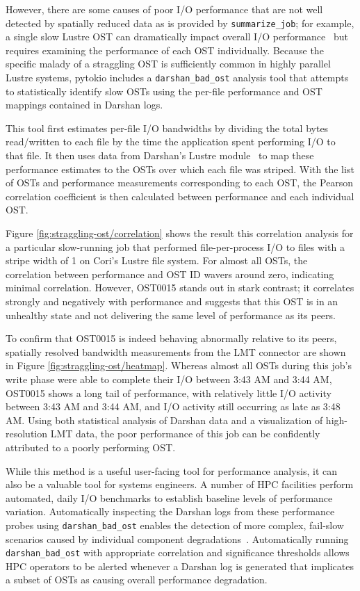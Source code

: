 However, there are some causes of poor I/O performance that are not well detected by spatially reduced data as is provided by \texttt{summarize\_job}; 
for example, a single slow Lustre OST can dramatically impact overall I/O performance~\cite{Byna2013} but requires examining the performance of each OST individually.
Because the specific malady of a straggling OST is sufficiently common in highly parallel Lustre systems, pytokio includes a \texttt{darshan\_bad\_ost} analysis tool that attempts to statistically identify slow OSTs using the per-file performance and OST mappings contained in Darshan logs.

This tool first estimates per-file I/O bandwidths by dividing the total bytes read/written to each file by the time the application spent performing I/O to that file.
It then uses data from Darshan's Lustre module~\cite{Snyder2016modular} to map these performance estimates to the OSTs over which each file was striped.
With the list of OSTs and performance measurements corresponding to each OST, the Pearson correlation coefficient is then calculated between performance and each individual OST.

Figure \ref{fig:straggling-ost/correlation} shows the result this correlation analysis for a particular slow-running job that performed file-per-process I/O to files with a stripe width of 1 on Cori's Lustre file system.
For almost all OSTs, the correlation between performance and OST ID wavers around zero, indicating minimal correlation.
However, OST0015 stands out in stark contrast; it correlates strongly and negatively with performance and suggests that this OST is in an unhealthy state and not delivering the same level of performance as its peers.

To confirm that OST0015 is indeed behaving abnormally relative to its peers, spatially resolved bandwidth measurements from the LMT connector are shown in Figure \ref{fig:straggling-ost/heatmap}.
Whereas almost all OSTs during this job's write phase were able to complete their I/O between 3:43 AM and 3:44 AM, OST0015 shows a long tail of performance, with relatively little I/O activity between 3:43 AM and 3:44 AM, and I/O activity still occurring as late as 3:48 AM.
Using both statistical analysis of Darshan data and a visualization of high-resolution LMT data, the poor performance of this job can be confidently attributed to a poorly performing OST.

While this method is a useful user-facing tool for performance analysis, it can also be a valuable tool for systems engineers.
A number of HPC facilities perform automated, daily I/O benchmarks to establish baseline levels of performance variation\cite{Lockwood2017,Simakov2015}.
Automatically inspecting the Darshan logs from these performance probes using  \texttt{darshan\_bad\_ost} enables the detection of more complex, fail-slow scenarios caused by individual component degradations~\cite{Gunawi2018}.
Automatically running \texttt{darshan\_bad\_ost} with appropriate correlation and significance thresholds allows HPC operators to be alerted whenever a Darshan log is generated that implicates a subset of OSTs as causing overall performance degradation.

